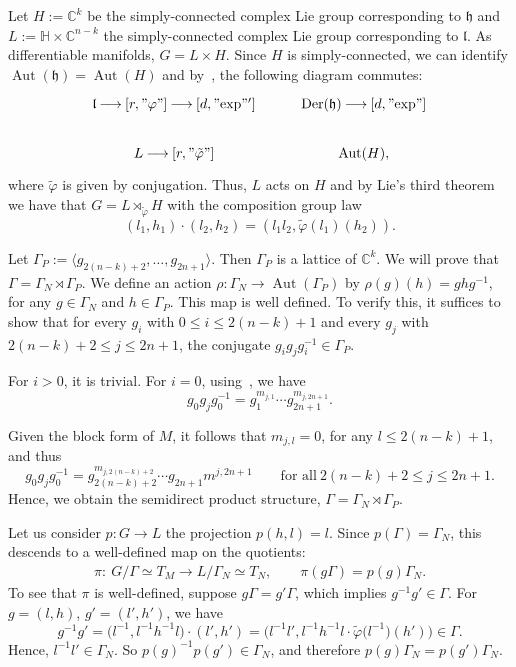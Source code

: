 \documentclass[pdftex]{sigma}
\newcommand{\C}{{\mathbb C}}
\renewcommand{\H}{{\mathbb H}}
\newcommand{\6}{\partial}
\newcommand{\arrow}{{\:\longrightarrow\:}}
\newcommand{\Aut}{\operatorname{Aut}}
\numberwithin{equation}{section}
\begin{document}
Let $H:=\C^k$ be the simply-connected complex Lie group corresponding to $\mathfrak{h}$ and $L:=\H \times \C^{n-k}$ the simply-connected complex Lie group corresponding to $\mathfrak{l}$. As differentiable manifolds, $G= L \times H$. Since $H$ is simply-connected, we can identify $\Aut(\mathfrak{h})=\Aut(H)$ and by~\cite[Theorem~3]{bry}, the following diagram commutes:
\[
\begin{tikzcd}
	\mathfrak{l} \arrow[r, "\varphi"] \arrow[d, "{\rm exp}"'] & {\rm Der}(\mathfrak{h}) \arrow[d, "{\rm exp}"] \\
	L \arrow[r, "\tilde{\varphi}"] & \Aut(H),
\end{tikzcd}
\] where $\tilde{\varphi}$ is given by conjugation.
Thus, $L$ acts on $H$ and by Lie's third theorem we have that $G=L \rtimes_{\tilde{\varphi}} H$ with the composition group law
\[
(l_1, h_1) \cdot(l_2, h_2)=(l_1l_2, \tilde{\varphi}(l_1)(h_2)).
\]

Let $\Gamma_P:=\bigl\langle g_{2(n-k)+2}, \dots, g_{2n+1}\bigr\rangle$. Then $\Gamma_P$ is a lattice of $\C^k$.
We will prove that $\Gamma=\Gamma_N \rtimes \Gamma_P$.
We define an action $\rho\colon \Gamma_N \longrightarrow \Aut(\Gamma_P)$ by $\rho(g)(h)=ghg^{-1}$, for any $g \in \Gamma_N$ and $h \in \Gamma_P$. This map is well defined. To verify this, it suffices to show that for every $g_i$ with $0 \leq i \leq 2(n-k)+1$ and every $g_j$ with $2(n-k)+2 \leq j \leq 2n+1$, the conjugate $g_ig_jg_i^{-1} \in \Gamma_P$.

For $i>0$, it is trivial.
For $i=0$, using~\cite[Lemma 2.3]{pajitnov1}, we have
\[
g_0g_jg_0^{-1}=g_1^{m_{j,1}} \cdots g_{2n+1}^{m_{j, 2n+1}}.
\]

Given the block form of $M$, it follows that $m_{j,l}=0$, for any $l \leq 2(n-k)+1$, and thus
\[
g_0g_jg_0^{-1}=g_{2(n-k)+2}^{m_{j, 2(n-k)+2}} \cdots g_{2n+1}m^{j, 2n+1} \qquad \text{for all}\ 2(n-k)+2 \leq j \leq 2n+1.
\]
Hence, we obtain the semidirect product structure, $\Gamma=\Gamma_N \rtimes \Gamma_P$.

Let us consider $p\colon G \longrightarrow L$ the projection $p(h,l)=l$.
Since $p(\Gamma)=\Gamma_N$, this descends to a well-defined map on the quotients:
\begin{align*}
\pi\colon \ G/\Gamma \simeq T_M \longrightarrow L/{\Gamma_N} \simeq T_N,\qquad
\pi(g\Gamma)=p(g)\Gamma_N.
\end{align*}
To see that $\pi$ is well-defined, suppose $g\Gamma=g'\Gamma$, which implies $g^{-1}g' \in \Gamma$. For $g=(l,h)$, $g'=(l',h')$, we have
\begin{equation*}
 g^{-1}g'=\big(l^{-1},l^{-1}h^{-1}l\big) \cdot (l',h')=\big(l^{-1}l', l^{-1}h^{-1}l \cdot \tilde{\varphi}\big(l^{-1}\big)(h')\big) \in \Gamma.
\end{equation*}
Hence, $l^{-1}l' \in \Gamma_N$. So $p(g)^{-1}p(g') \in \Gamma_N$, and therefore $p(g)\Gamma_N=p(g')\Gamma_N$.
\end{document}

